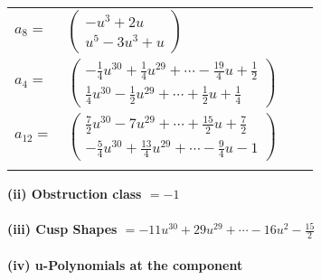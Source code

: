 \documentclass[1p]{elsarticle_modified}
\theoremstyle{definition}
\begin{document}
\begin{tabular}{m{7pt} m{180pt} m{7pt} m{180pt} }
\flushright $a_{8}=$&$\begin{pmatrix}- u^3+2 u\\u^5-3 u^3+u\end{pmatrix}$ \\
\flushright $a_{4}=$&$\begin{pmatrix}-\frac{1}{4} u^{30}+\frac{1}{4} u^{29}+\cdots-\frac{19}{4} u+\frac{1}{2}\\\frac{1}{4} u^{30}-\frac{1}{2} u^{29}+\cdots+\frac{1}{2} u+\frac{1}{4}\end{pmatrix}$ \\
\flushright $a_{12}=$&$\begin{pmatrix}\frac{7}{2} u^{30}-7 u^{29}+\cdots+\frac{15}{2} u+\frac{7}{2}\\-\frac{5}{4} u^{30}+\frac{13}{4} u^{29}+\cdots-\frac{9}{4} u-1\end{pmatrix}$\\&\end{tabular}
\flushleft \textbf{(ii) Obstruction class $= -1$}\\~\\
\flushleft \textbf{(iii) Cusp Shapes $= -11 u^{30}+29 u^{29}+\cdots-16 u^2-\frac{15}{2}$}\\~\\
\newpage\renewcommand{\arraystretch}{1}
\flushleft \textbf{(iv) u-Polynomials at the component}\newline \\
\end{document}
